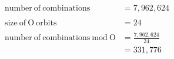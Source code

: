 \documentclass[preview, border=2mm]{standalone}
\begin{document}
\vspace*{\fill}

{\fontsize{32pt}{40pt}\selectfont
	\begin{align*}
		\mathrm{number\ of\ combinations} &= 7,962,624 \\
		\\
		\mathrm{size\ of\ O\ orbits} &= 24 \\
		\\
		\mathrm{number\ of\ combinations\ mod\ O} &= \frac{7,962,624}{24} \\
			&= 331,776
	\end{align*}
}

\vspace*{\fill}
\end{document}

